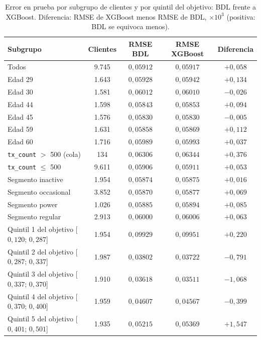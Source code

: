 \begin{table}[tbp]
  \centering\scriptsize\setlength{\tabcolsep}{5pt}
  \caption{Error en prueba por subgrupo de clientes y por quintil del objetivo: BDL frente a XGBoost. Diferencia: RMSE de XGBoost menos RMSE de BDL, $\times 10^{3}$ (positiva: BDL se equivoca menos).}
  \label{tab:errores}
  \begin{tabular}{lcccc}
    \toprule
    Subgrupo & Clientes & RMSE BDL & RMSE XGBoost & Diferencia \\
    \midrule
    Todos & 9.745 & $0{,}05912$ & $0{,}05917$ & $+0{,}058$ \\
    \midrule
    Edad 29 & 1.643 & $0{,}05928$ & $0{,}05942$ & $+0{,}134$ \\
    Edad 30 & 1.581 & $0{,}06012$ & $0{,}06010$ & $-0{,}026$ \\
    Edad 44 & 1.598 & $0{,}05843$ & $0{,}05853$ & $+0{,}094$ \\
    Edad 45 & 1.576 & $0{,}05830$ & $0{,}05830$ & $-0{,}005$ \\
    Edad 59 & 1.631 & $0{,}05858$ & $0{,}05869$ & $+0{,}112$ \\
    Edad 60 & 1.716 & $0{,}05989$ & $0{,}05993$ & $+0{,}037$ \\
    \midrule
    \texttt{tx\_count} $>$ 500 (cola) & 134 & $0{,}06306$ & $0{,}06344$ & $+0{,}376$ \\
    \texttt{tx\_count} $\leq$ 500 & 9.611 & $0{,}05906$ & $0{,}05911$ & $+0{,}053$ \\
    \midrule
    Segmento inactive & 1.954 & $0{,}05874$ & $0{,}05875$ & $+0{,}016$ \\
    Segmento occasional & 3.852 & $0{,}05870$ & $0{,}05877$ & $+0{,}069$ \\
    Segmento power & 1.026 & $0{,}05885$ & $0{,}05894$ & $+0{,}085$ \\
    Segmento regular & 2.913 & $0{,}06000$ & $0{,}06006$ & $+0{,}063$ \\
    \midrule
    Quintil 1 del objetivo [$0{,}120$; $0{,}287$] & 1.954 & $0{,}09929$ & $0{,}09951$ & $+0{,}220$ \\
    Quintil 2 del objetivo [$0{,}287$; $0{,}337$] & 1.987 & $0{,}03802$ & $0{,}03722$ & $-0{,}791$ \\
    Quintil 3 del objetivo [$0{,}337$; $0{,}370$] & 1.910 & $0{,}03618$ & $0{,}03511$ & $-1{,}068$ \\
    Quintil 4 del objetivo [$0{,}370$; $0{,}400$] & 1.959 & $0{,}04607$ & $0{,}04567$ & $-0{,}399$ \\
    Quintil 5 del objetivo [$0{,}401$; $0{,}501$] & 1.935 & $0{,}05215$ & $0{,}05369$ & $+1{,}547$ \\
    \bottomrule
  \end{tabular}
\end{table}
